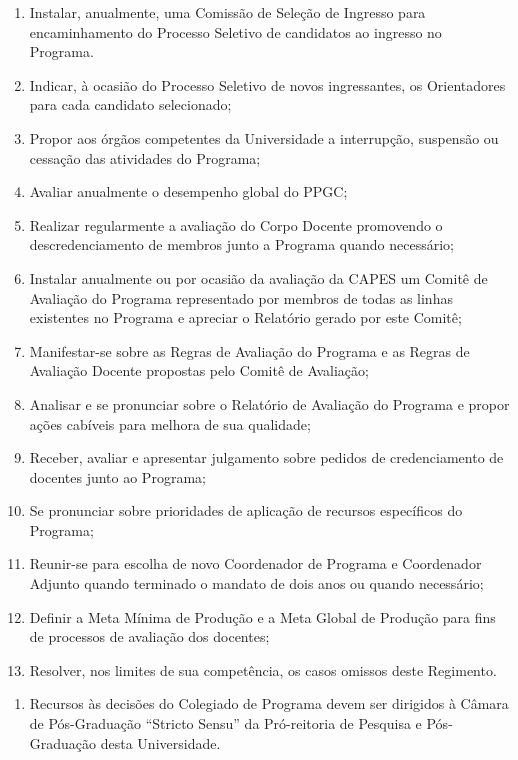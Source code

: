 \documentclass{article}
\newcommand{\singleitem}{\item[Parágrafo Único.]}
\begin{document}
\begin{enumerate}
\begin{enumerate}[label=\Roman*]
		\item Instalar, anualmente, uma Comissão de Seleção de Ingresso para encaminhamento do Processo Seletivo de candidatos ao ingresso no Programa.
		\item Indicar, à ocasião do Processo Seletivo de novos ingressantes, os Orientadores para cada candidato selecionado; %
		\item Propor aos órgãos competentes da Universidade a interrupção, suspensão ou cessação das atividades do Programa;
		\item Avaliar anualmente o desempenho global do PPGC;
		\item Realizar regularmente a avaliação do Corpo Docente promovendo o descredenciamento de membros junto a Programa quando necessário;
		\item Instalar anualmente ou por ocasião da avaliação da CAPES um Comitê de Avaliação do Programa representado por membros de todas as linhas existentes no Programa e apreciar o Relatório gerado por este Comitê; 
		\item Manifestar-se sobre as Regras de Avaliação do Programa e as Regras de Avaliação Docente propostas pelo Comitê de Avaliação;
		\item Analisar e se pronunciar sobre o Relatório de Avaliação do Programa e propor ações cabíveis para melhora de sua qualidade;
		\item Receber, avaliar e apresentar julgamento sobre pedidos de credenciamento de docentes junto ao Programa;
		\item Se pronunciar sobre prioridades de aplicação de recursos específicos do Programa;
		\item Reunir-se para escolha de novo Coordenador de Programa e Coordenador Adjunto quando terminado o mandato de dois anos ou quando necessário; 

		\item Definir a Meta Mínima de Produção e a Meta Global de Produção para fins de processos de avaliação dos docentes;

		\item Resolver, nos limites de sua competência, os casos omissos deste Regimento.
	\end{enumerate}
	\begin{enumerate}
		\singleitem Recursos às decisões do Colegiado de Programa devem ser dirigidos à Câmara de Pós-Graduação ``Stricto Sensu'' da Pró-reitoria de Pesquisa e Pós-Graduação desta Universidade.
	\end{enumerate}
\end{enumerate}
\end{document}
